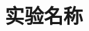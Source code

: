 \documentclass{whureport}
\title{\homeworkname}
\date{}
\begin{document}
\makecover


\section{实验名称}






\makeend
\end{document}
